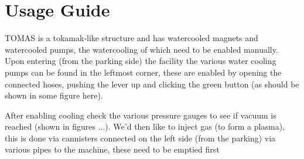 \section{Usage Guide}
TOMAS is a tokamak-like structure and has watercooled magnets and watercooled pumps, the watercooling of which need to be enabled manually. Upon entering (from the parking side) the facility the various water cooling pumps
can be found in the leftmost corner, these are enabled by opening the connected hoses, pushing the lever up and clicking the green button (as should be shown in some figure here).

After enabling cooling check the various pressure gauges to see if vacuum is reached (shown in figures ...). We'd then like to inject gas (to form a plasma), this is done via cannisters connected on the left side (from the parking) via various 
pipes to the machine, these need to be emptied first

